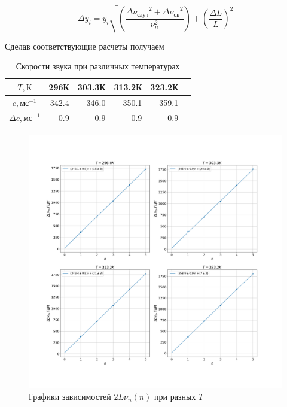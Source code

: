 \documentclass[a4paper, 12pt]{article}
\begin{document}
    \begin{equation}
        \Delta y_i = y_i \sqrt{
        \left(\frac{{\Delta\nu_{случ}}^2 + {\Delta\nu_{ок}}^2}{\nu_n^2}\right) +
        \left(\frac{\Delta L}{L}\right)^2}
    \end{equation}

    Сделав соответствующие расчеты получаем

    \begin{table}[h]
        \begin{center}
            \begin{tabular}{|c|r|r|r|r|r|}
                \hline
                {$T, К$} &   296К &  303.3К &  313.2К &  323.2К \\\hline
                {$c, мс^{-1}$} &   342.4 & 346.0 & 350.1 & 359.1 \\\hline
                {$\Delta c, мс^{-1}$} &   0.9 &  0.9 &  0.9 &  0.9 \\\hline
            \end{tabular}
        \end{center}
        \caption{Скорости звука при различных температурах}
    \end{table}

    \begin{figure}[t]
        \includegraphics[width=\textwidth]{speed_of_sound_plots}
        \caption{Графики зависимостей $2L\nu_n(n)$ при разных $T$}
    \end{figure}
\end{document}
